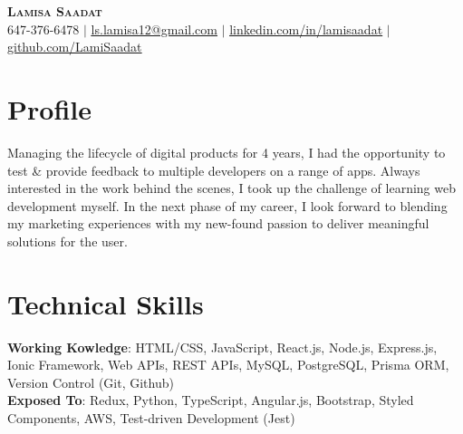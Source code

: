 \documentclass[letterpaper,11pt]{article}
\begin{document}

\begin{center}
    \textbf{\Huge \scshape Lamisa Saadat} \\ \vspace{1pt}
    \small 647-376-6478 $|$ \href{mailto:ls.lamisa12@gmail.com}{\underline{ls.lamisa12@gmail.com}} $|$ 
    \href{http://www.linkedin.com/in/lamisaadat}{\underline{linkedin.com/in/lamisaadat}} $|$
    \href{https://github.com/LamiSaadat}{\underline{github.com/LamiSaadat}}
\end{center}

\section{Profile}
 \begin{itemize}[leftmargin=0.15in, label={}]
    \small{\item{
     {Managing the lifecycle of digital products for 4 years, I had the opportunity to test & provide feedback to multiple developers on a range of apps. Always interested in the work behind the scenes, I took up the challenge of learning web development myself. In the next phase of my career, I look forward to blending my marketing experiences with my new-found passion to deliver meaningful solutions for the user.} \\
    }}
 \end{itemize}

\section{Technical Skills}
 \begin{itemize}[leftmargin=0.15in, label={}]
    \small{\item{
     \textbf{Working Kowledge}{: HTML/CSS, JavaScript, React.js, Node.js, Express.js, Ionic Framework, Web APIs, REST APIs, MySQL, PostgreSQL, Prisma ORM, Version Control (Git, Github)} \\
     \textbf{Exposed To}{: Redux, Python, TypeScript, Angular.js, Bootstrap, Styled Components, AWS, Test-driven Development (Jest)} \\
    }}
 \end{itemize}
\end{document}
